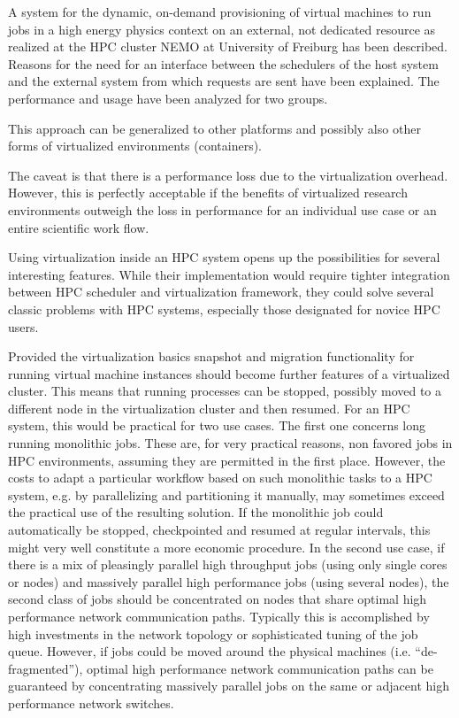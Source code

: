 A system for the dynamic, on-demand provisioning of virtual machines to run jobs
in a high energy physics context on an external, not dedicated resource as
realized at the HPC cluster NEMO at University of Freiburg has been
described.  Reasons for the need for an interface between the schedulers of the
host system and the external system from which requests are sent have been
explained.  The performance and usage have been analyzed for two groups. 

This approach can be generalized to other platforms and possibly also other
forms of virtualized environments (containers).

The caveat is that there is a performance loss due to the virtualization
overhead. However, this is perfectly acceptable if the benefits of virtualized
research environments outweigh the loss in performance for an individual use
case or an entire scientific work flow.

Using virtualization inside an HPC system opens up the possibilities for several
interesting features. While their implementation would require tighter
integration between HPC scheduler and virtualization framework, they could solve
several classic problems with HPC systems, especially those designated for
novice HPC users. 

Provided the virtualization basics snapshot and migration functionality for
running virtual machine instances should become further features of a
virtualized cluster. This means that running processes can be stopped, possibly
moved to a different node in the virtualization cluster and then resumed. For an
HPC system, this would be practical for two use cases. The first one concerns
long running monolithic jobs. These are, for very practical reasons, non favored
jobs in HPC environments, assuming they are permitted in the first place.
However, the costs to adapt a particular workflow based on such monolithic tasks
to a HPC system, e.g. by parallelizing and partitioning it manually, may
sometimes exceed the practical use of the resulting solution. If the monolithic
job could automatically be stopped, checkpointed and resumed at regular
intervals, this might very well constitute a more economic procedure. In the
second use case, if there is a mix of pleasingly parallel high throughput jobs
(using only single cores or nodes) and massively parallel high performance jobs
(using several nodes), the second class of jobs should be concentrated on nodes
that share optimal high performance network communication paths. Typically this
is accomplished by high investments in the network topology or sophisticated
tuning of the job queue. However, if jobs could be moved around the physical
machines (i.e. ``de-fragmented''), optimal high performance network communication
paths can be guaranteed by concentrating massively parallel jobs on the same or
adjacent high performance network switches.

